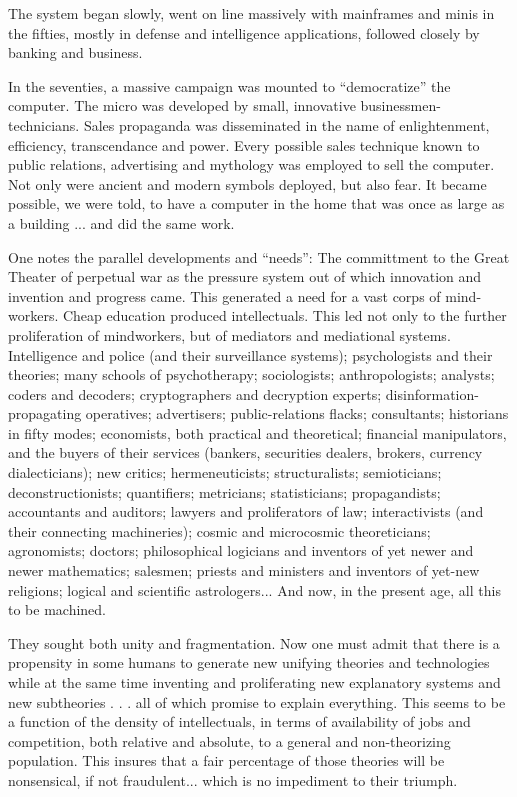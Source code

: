 The system began slowly, went on line
massively with mainframes and minis in the
fifties, mostly
in defense
and intelligence
applications, followed closely by banking
and business.

In the seventies, a massive campaign was
mounted to \enquote{democratize} the computer.
The micro was developed by small, innovative businessmen-technicians.
Sales propaganda was disseminated
in the name of enlightenment, efficiency, transcendance
and power. Every possible sales technique
known to public relations, advertising and
mythology was employed to sell the computer.
Not only were ancient and modern
symbols deployed, but also fear. It became
possible, we were told, to have a computer in
the home that was once as large as a building
... and did the same work.

One notes the parallel developments and
\enquote{needs}: The committment to the Great
Theater of perpetual war as the pressure
system out of which innovation and invention and progress came. This generated a
need for a vast corps of mind-workers. Cheap
education produced intellectuals. This led
not only to the further proliferation of mindworkers, but of mediators and mediational
systems. Intelligence and police (and their
surveillance systems); psychologists and
their theories; many schools of psychotherapy; sociologists; anthropologists; analysts;
coders and decoders; cryptographers and decryption experts; 
disinformation-propagating operatives; advertisers; public-relations
flacks; consultants; historians in fifty modes;
economists, both practical and theoretical;
financial manipulators, and the buyers of
their services (bankers, securities dealers,
brokers, currency dialecticians); new critics;
hermeneuticists; structuralists; semioticians;
deconstructionists; quantifiers; metricians;
statisticians; propagandists; accountants and
auditors; lawyers and proliferators of law;
interactivists (and their connecting machineries); cosmic and microcosmic theoreticians;
agronomists; doctors; philosophical logicians
and inventors of yet newer and newer mathematics; salesmen; priests and ministers and
inventors of yet-new religions; logical and
scientific astrologers... And now, in the
present age, all this to be machined.

They sought both unity and fragmentation. Now one must admit that there is a
propensity in some humans to generate new
unifying theories and technologies while
at the same time inventing and proliferating new explanatory systems and new subtheories . . . all of which promise to explain
everything. This seems to be a function of
the density of intellectuals, in terms of availability of jobs and competition, both relative
and absolute, to a general and non-theorizing
population. This insures that a fair percentage of those theories will be nonsensical, if
not fraudulent... which is no impediment to
their triumph.

